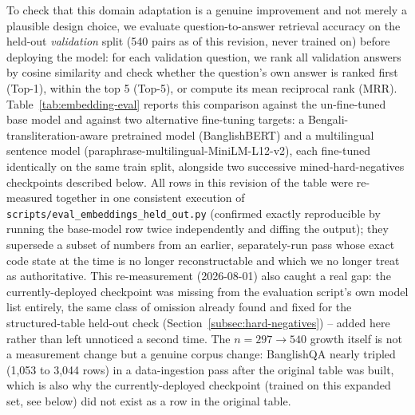 \documentclass[a4paper,twoside]{article}
\begin{document}
To check that this domain adaptation is a genuine improvement and not merely a plausible design choice, we evaluate question-to-answer retrieval accuracy on the held-out \emph{validation} split (540 pairs as of this revision, never trained on) before deploying the model: for each validation question, we rank all validation answers by cosine similarity and check whether the question's own answer is ranked first (Top-1), within the top 5 (Top-5), or compute its mean reciprocal rank (MRR). Table~\ref{tab:embedding-eval} reports this comparison against the un-fine-tuned base model and against two alternative fine-tuning targets: a Bengali-transliteration-aware pretrained model (BanglishBERT) and a multilingual sentence model (paraphrase-multilingual-MiniLM-L12-v2), each fine-tuned identically on the same train split, alongside two successive mined-hard-negatives checkpoints described below. All rows in this revision of the table were re-measured together in one consistent execution of \texttt{scripts/eval\_embeddings\_held\_out.py} (confirmed exactly reproducible by running the base-model row twice independently and diffing the output); they supersede a subset of numbers from an earlier, separately-run pass whose exact code state at the time is no longer reconstructable and which we no longer treat as authoritative. This re-measurement (2026-08-01) also caught a real gap: the currently-deployed checkpoint was missing from the evaluation script's own model list entirely, the same class of omission already found and fixed for the structured-table held-out check (Section~\ref{subsec:hard-negatives}) -- added here rather than left unnoticed a second time. The $n=297\to540$ growth itself is not a measurement change but a genuine corpus change: BanglishQA nearly tripled (1{,}053 to 3{,}044 rows) in a data-ingestion pass after the original table was built, which is also why the currently-deployed checkpoint (trained on this expanded set, see below) did not exist as a row in the original table.
\end{document}
